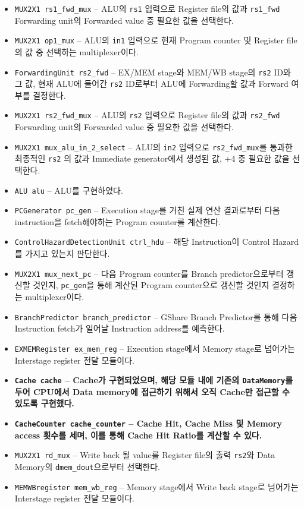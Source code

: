 \documentclass{scrartcl}
\begin{document}
\begin{itemize}
  \item \texttt{MUX2X1 rs1\_fwd\_mux} -- ALU의 \texttt{rs1} 입력으로 Register file의 값과 \texttt{rs1\_fwd} Forwarding unit의 Forwarded value 중 필요한 값을 선택한다.
  \item \texttt{MUX2X1 op1\_mux} -- ALU의 \texttt{in1} 입력으로 현재 Program counter 및 Register file의 값 중 선택하는 multiplexer이다.
  \item \texttt{ForwardingUnit rs2\_fwd} -- EX/MEM stage와 MEM/WB stage의 \texttt{rs2} ID와 그 값, 현재 ALU에 들어간 \texttt{rs2} ID로부터 ALU에 Forwarding할 값과 Forward 여부를 결정한다.
  \item \texttt{MUX2X1 rs2\_fwd\_mux} -- ALU의 \texttt{rs2} 입력으로 Register file의 값과 \texttt{rs2\_fwd} Forwarding unit의 Forwarded value 중 필요한 값을 선택한다.
  \item \texttt{MUX2X1 mux\_alu\_in\_2\_select} -- ALU의 \texttt{in2} 입력으로 \texttt{rs2\_fwd\_mux}를 통과한 최종적인 \texttt{rs2} 의 값과 Immediate generator에서 생성된 값, +4 중 필요한 값을 선택한다.
  \item \texttt{ALU alu} -- ALU를 구현하였다.
  \item \texttt{PCGenerator pc\_gen} -- Execution stage를 거친 실제 연산 결과로부터 다음 instruction을 fetch해야하는 Program counter를 계산한다.
  \item \texttt{ControlHazardDetectionUnit ctrl\_hdu} -- 해당 Instruction이 Control Hazard를 가지고 있는지 판단한다.
  \item \texttt{MUX2X1 mux\_next\_pc} -- 다음 Program counter를 Branch predictor으로부터 갱신할 것인지, \texttt{pc\_gen}을 통해 계산된 Program counter으로 갱신할 것인지 결정하는 multiplexer이다.
  \item \texttt{BranchPredictor branch\_predictor} -- GShare Branch Predictor를 통해 다음 Instruction fetch가 일어날 Instruction address를 예측한다.
  \item \texttt{EXMEMRegister ex\_mem\_reg} -- Execution stage에서 Memory stage로 넘어가는 Interstage register 전달 모듈이다.
  \item \textbf{\texttt{Cache cache} -- Cache가 구현되었으며, 해당 모듈 내에 기존의 \texttt{DataMemory}를 두어 CPU에서 Data memory에 접근하기 위해서 오직 Cache만 접근할 수 있도록 구현했다.}
  \item \textbf{\texttt{CacheCounter cache\_counter} -- Cache Hit, Cache Miss 및 Memory access 횟수를 세며, 이를 통해 Cache Hit Ratio를 계산할 수 있다.}
  \item \texttt{MUX2X1 rd\_mux} -- Write back 될 value를 Register file의 출력 \texttt{rs2}와 Data Memory의 \texttt{dmem\_dout}으로부터 선택한다.
  \item \texttt{MEMWBregister mem\_wb\_reg} -- Memory stage에서 Write back stage로 넘어가는 Interstage register 전달 모듈이다.
\end{itemize}
\end{document}
